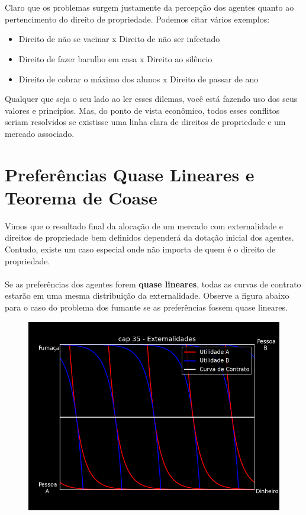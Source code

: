 \documentclass[a4paper,11pt,oneside]{book}
\theoremstyle{definition}
\theoremstyle{break}
\begin{document}
\\
\\
Claro que os problemas surgem justamente da percepção dos agentes quanto ao pertencimento do direito de propriedade. Podemos citar vários exemplos:
\begin{itemize}
	\item Direito de não se vacinar x Direito de não ser infectado
	\item Direito de fazer barulho em casa x Direito ao silêncio
	\item Direito de cobrar o máximo dos alunos x Direito de passar de ano
\end{itemize}

Qualquer que seja o seu lado ao ler esses dilemas, você está fazendo uso dos seus valores e princípios. Mas, do ponto de vista econômico, todos esses conflitos seriam resolvidos se existisse uma linha clara de direitos de propriedade e um mercado associado.

\section{Preferências Quase Lineares e Teorema de Coase}

Vimos que o resultado final da alocação de um mercado com externalidade e direitos de propriedade bem definidos dependerá da dotação inicial dos agentes. Contudo, existe um caso especial onde não importa de quem é o direito de propriedade.
\\
\\
Se as preferências dos agentes forem \textbf{quase lineares}, todas as curvas de contrato estarão em uma mesma distribuição da externalidade. Observe a figura abaixo para o caso do problema dos fumante se as preferências fossem quase lineares.

\begin{figure}[H]
	\centering
	\includegraphics[scale=0.8]{cap35_2-teorema_coase.png}
\end{figure}
\end{document}
